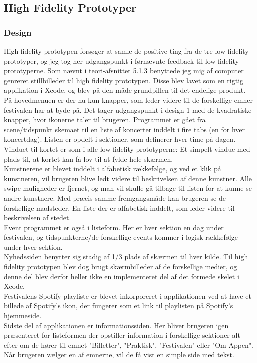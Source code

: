 \documentclass[a4paper,10pt,titlepage]{article}
\begin{document}
\subsection{High Fidelity Prototyper}
\subsubsection{Design}
High fidelity prototypen forsøger at samle de positive ting fra de tre low fidelity prototyper, og jeg tog her udgangspunkt i førnævnte feedback til low fidelity prototyperne. Som nævnt i teori-afsnittet 5.1.3 benyttede jeg mig af computer genreret stillbilleder til high fidelity prototypen. Disse blev lavet som en rigtig applikation i Xcode, og blev på den måde grundpillen til det endelige produkt. \\
På hovedmenuen er der nu kun knapper, som leder videre til de forskellige emner festivalen har at byde på. Det tager udgangspunkt i design 1 med de kvadratiske knapper, hvor ikonerne taler til brugeren. Programmet er gået fra scene/tidspunkt skemaet til en liste af koncerter inddelt i fire tabs (en for hver koncertdag). Listen er opdelt i sektioner, som definerer hver time på dagen.	\\
Vinduet til kortet er som i alle low fidelity prototyperne: Et simpelt vindue med plads til, at kortet kan få lov til at fylde hele skærmen.\\
Kunstnerene er blevet inddelt i alfabetisk rækkefølge, og ved et klik på kunstneren, vil brugeren blive ledt videre til beskrivelsen af denne kunstner. Alle swipe muligheder er fjernet, og man vil skulle gå tilbage til listen for at kunne se andre kunstnere. Med præcis samme fremgangsmåde kan brugeren se de forskellige madsteder. En liste der er alfabetisk inddelt, som leder videre til beskrivelsen af stedet.\\
Event programmet er også i listeform. Her er hver sektion en dag under festivalen, og tidspunkterne/de forskellige events kommer i logisk rækkefølge under hver sektion.\\
Nyhedssiden benytter sig stadig af 1/3 plads af skærmen til hver kilde. Til high fidelity prototypen blev dog brugt skærmbilleder af de forskellige medier, og denne del blev derfor heller ikke en implementeret del af det formede skelet i Xcode.\\
Festivalens Spotify playliste er blevet inkorporeret i applikationen ved at have et billede af Spotify's ikon, der fungerer som et link til playlisten på Spotify's hjemmeside.\\
Sidste del af applikationen er informationssiden. Her bliver brugeren igen præsenteret for listeformen der opstiller information i forskellige sektioner alt efter om de hører til emnet "Billetter", "Praktisk", "Festivalen" eller "Om Appen". Når brugeren vælger en af emnerne, vil de få vist en simple side med tekst.
\end{document}
